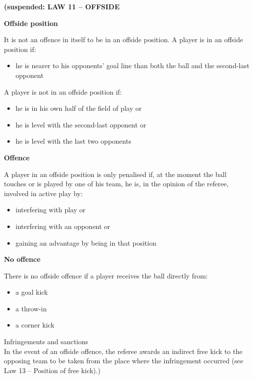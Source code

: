 \clearpage
\sffamily
{\color[rgb]{0.4,0.4,0.4}
\textbf{(suspended: LAW 11 -- OFFSIDE} }

\bigskip

{\color[rgb]{0.4,0.4,0.4}\textbf{Offside position}

\headlinebox

It is not an offence in itself to be in an offside position. A player is in an offside position if:

\begin{itemize}
\item he is nearer to his opponents{\textquoteright} goal line than both the ball and the second-last opponent
\end{itemize}

\bigskip

A player is not in an offside position if:

\begin{itemize}
\item he is in his own half of the field of play or
\item he is level with the second-last opponent or
\item he is level with the last two opponents
\end{itemize}
}

{\color[rgb]{0.4,0.4,0.4}\textbf{Offence}

\headlinebox

A player in an offside position is only penalised if, at the moment the ball touches or is played by one of his team, he is, in the opinion of the referee, involved in active play by:

\begin{itemize}
\item interfering with play or 
\item interfering with an opponent or 
\item gaining an advantage by being in that position
\end{itemize}
}

{\color[rgb]{0.4,0.4,0.4} \textbf{No offence}

\headlinebox

There is no offside offence if a player receives the ball directly from:

\begin{itemize}
\item a goal kick 
\item a throw-in 
\item a corner kick 
\end{itemize}
Infringements and sanctions \\
In the event of an offside offence, the referee awards an indirect free kick to the opposing team to be taken from the place where the infringement occurred (see Law 13 -- Position of free kick).) 

}
